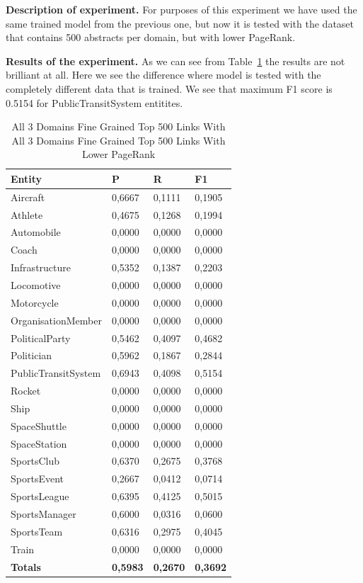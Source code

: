 \documentclass[thesis=M,english]{FITthesis}[2018/05/30]
\begin{document}
\textbf{Description of experiment.} For purposes of this experiment we have used the same trained model from the previous one, but now it is tested with the dataset that contains 500 abstracts per domain, but with lower PageRank.

\textbf{Results of the experiment.} As we can see from Table~\ref{table:Global500FineDomainTestedWithTwo500Datasets} the results are not brilliant at all. Here we see the difference where model is tested with the completely different data that is trained. We see that maximum F1 score is 0.5154 for PublicTransitSystem entitites. 

	\begin{table}[H]\centering
		\begin{tabular}{|l|l|l|l|}
			\hline {\textbf{Entity}} & {\textbf{P}} & {\textbf{R}} & {\textbf{F1}}\\\hline
				Aircraft & 0,6667 & 0,1111 & 0,1905\\
				Athlete & 0,4675 & 0,1268 & 0,1994\\
				Automobile & 0,0000 & 0,0000 & 0,0000\\ 
				Coach & 0,0000 & 0,0000 & 0,0000\\
				Infrastructure & 0,5352 & 0,1387 & 0,2203\\
				Locomotive & 0,0000 & 0,0000 & 0,0000\\
				Motorcycle & 0,0000 & 0,0000 & 0,0000\\
				OrganisationMember & 0,0000 & 0,0000 & 0,0000\\				
				PoliticalParty & 0,5462 & 0,4097 & 0,4682\\
				Politician & 0,5962 & 0,1867 & 0,2844\\
				PublicTransitSystem & 0,6943 & 0,4098 & 0,5154\\
				Rocket & 0,0000 & 0,0000 & 0,0000\\				
				Ship & 0,0000 & 0,0000 & 0,0000\\
				SpaceShuttle & 0,0000 & 0,0000 & 0,0000\\
				SpaceStation & 0,0000 & 0,0000 & 0,0000\\ 
				SportsClub & 0,6370 & 0,2675 & 0,3768\\
				SportsEvent & 0,2667 & 0,0412 & 0,0714\\
				SportsLeague & 0,6395 & 0,4125 & 0,5015\\
				SportsManager & 0,6000 & 0,0316 & 0,0600\\
				SportsTeam & 0,6316 & 0,2975 & 0,4045\\
				Train & 0,0000 & 0,0000 & 0,0000\\\hline
				\textbf{Totals} & \textbf{0,5983} & \textbf{0,2670} & \textbf{0,3692}\\\hline
		\end{tabular}
		\caption{All 3 Domains Fine Grained Top 500 Links With All 3 Domains Fine Grained Top 500 Links With Lower PageRank \label{table:Global500FineDomainTestedWithTwo500Datasets}}
	\end{table}
\end{document}
